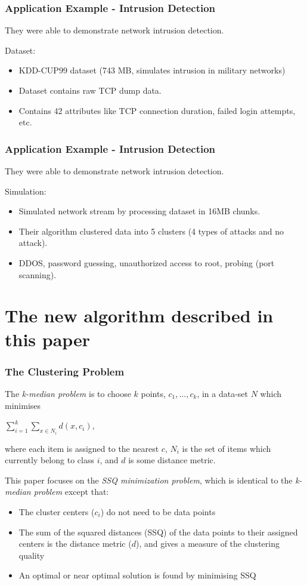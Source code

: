 \documentclass{beamer}
\begin{document}
\frame
{
  \frametitle{Application Example - Intrusion Detection}
  
  They were able to demonstrate network intrusion detection. \newline

  Dataset:
  \begin{itemize}
    \item KDD-CUP99 dataset (743 MB, simulates intrusion in military networks)
    \item Dataset contains raw TCP dump data.
    \item Contains 42 attributes like TCP connection duration, failed login attempts, etc.
    \newline
  \end{itemize}
}

\frame
{
  \frametitle{Application Example - Intrusion Detection}

  They were able to demonstrate network intrusion detection. \newline

  Simulation:
  \begin{itemize}
    \item Simulated network stream by processing dataset in 16MB chunks.
    \item Their algorithm clustered data into 5 clusters (4 types of attacks and no attack).
    \item DDOS, password guessing, unauthorized access to root, probing (port scanning). 
  \end{itemize}
}

\section{The new algorithm described in this paper}

\frame
{
  \frametitle{The Clustering Problem}
  
  The {\em k-median problem} is to choose $k$ points, $c_1, ..., c_k$, 
  in a data-set $N$ which minimises 
  
  \begin{center}
  	$\sum_{i=1}^k \sum_{x \in N_i} d(x, c_i)$,
  \end{center}
  
  
  where each item is assigned to the nearest $c$, $N_i$ is the set of
  items which currently belong to class $i$, and $d$ is some distance metric. 
    
  \bigskip
  This paper focuses on the {\em SSQ minimization problem}, which is identical to 
  the {\em k-median problem} except that: 
  
  \begin{itemize}
  \item The cluster centers ($c_i$) do not need to be data points 
  \item The sum of the squared distances (SSQ) of the data points to
   their assigned centers is the distance metric ($d$), and gives a 
   measure of the clustering quality
  \item An optimal or near optimal solution is found by minimising SSQ
  \end{itemize}
  
}
\end{document}
